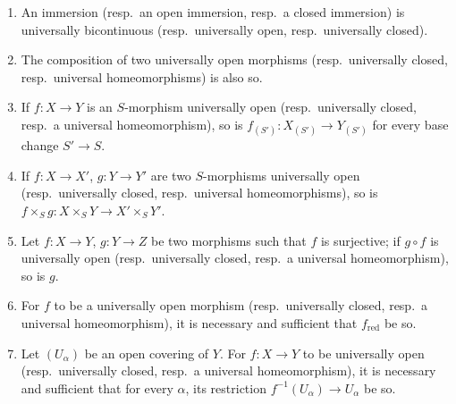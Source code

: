 \begin{proposition}[2.4.3]
\label{IV.2.4.3}
\medskip\noindent
\begin{enumerate}[label=(\roman*)]
  \item An immersion \textnormal{(}resp.\ an open immersion, resp.\ a closed immersion\textnormal{)} is universally bicontinuous \textnormal{(}resp.\ universally open, resp.\ universally closed\textnormal{)}.
  \item The composition of two universally open morphisms \textnormal{(}resp.\ universally closed, resp.\ universal homeomorphisms\textnormal{)} is also so.
  \item If $f:X\to Y$ is an $S$-morphism universally open \textnormal{(}resp.\ universally closed, resp.\ a universal homeomorphism\textnormal{)}, so is $f_{(S')}:X_{(S')}\to Y_{(S')}$ for every base change $S'\to S$.
  \item If $f:X\to X'$, $g:Y\to Y'$ are two $S$-morphisms universally open \textnormal{(}resp.\ universally closed, resp.\ universal homeomorphisms\textnormal{)}, so is $f\times_S g:X\times_S Y\to X'\times_S Y'$.
  \item Let $f:X\to Y$, $g:Y\to Z$ be two morphisms such that $f$ is surjective; if $g\circ f$ is universally open \textnormal{(}resp.\ universally closed, resp.\ a universal homeomorphism\textnormal{)}, so is $g$.
  \item For $f$ to be a universally open morphism \textnormal{(}resp.\ universally closed, resp.\ a universal homeomorphism\textnormal{)}, it is necessary and sufficient that $f_{\mathrm{red}}$ be so.
  \item Let $(U_\alpha)$ be an open covering of $Y$. For $f:X\to Y$ to be universally open \textnormal{(}resp.\ universally closed, resp.\ a universal homeomorphism\textnormal{)}, it is necessary and sufficient that for every $\alpha$, its restriction $f^{-1}(U_\alpha)\to U_\alpha$ be so.
\end{enumerate}
\end{proposition}


